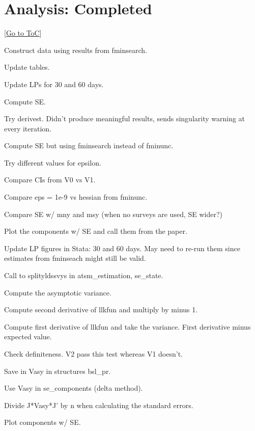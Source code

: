 \documentclass[12pt]{article}
\newcommand{\gototoc}{\vspace{-1.8cm} \null\hfill [\hyperlink{toc}{Go to ToC}] \newline}
\newcommand{\cmark}{\ding{51}}
\newcommand{\xmark}{\ding{55}}
\newcommand{\done}{\rlap{$\square$}{\raisebox{2pt}{\large\hspace{1pt}\cmark}}%
	\hspace{-2.5pt}}
\newcommand{\wontdo}{\rlap{$\square$}{\large\hspace{1pt}\xmark}}
\begin{document}
\section{Analysis: Completed}
\gototoc
	\begin{todolist}
	\item[\done] Construct data using results from fminsearch.
	\item[\done] Update tables.
	\item[\done] Update LPs for 30 and 60 days.
	\item[\done] Compute SE.
	\begin{todolist}
		\item[\done] Try derivest. Didn't produce meaningful results, sends singularity warning at every iteration. 
		\item[\done] Compute SE but using fminsearch instead of fminunc.
		\item[\done] Try different values for epsilon.
		\item[\done] Compare CIs from V0 vs V1.
		\item[\done] Compare eps = 1e-9 vs hessian from fminunc.
		\item[\done] Compare SE w/ mny and msy (when no surveys are used, SE wider?)
	\end{todolist}
	\item[\done] Plot the components w/ SE and call them from the paper.
	\item[\wontdo] Update LP figures in Stata: 30 and 60 days. May need to re-run them since estimates from fminseach might still be valid.
	\item[\done] Call to splityldssvys in atsm_estimation, se_state.
	\item[\done] Compute the asymptotic variance.
	\begin{todolist}
		\item[\done] Compute second derivative of llkfun and multiply by minus 1.
		\item[\done] Compute first derivative of llkfun and take the variance. First derivative minus expected value.
		\item[\done] Check definiteness. V2 pass this test whereas V1 doesn't.
		\item[\done] Save in Vasy in structures bsl_pr.
		\item[\done] Use Vasy in se_components (delta method).
		\item[\done] Divide J*Vasy*J' by n when calculating the standard errors.
		\item[\done] Plot components w/ SE.

\end{todolist}
\end{todolist}
\end{document}
